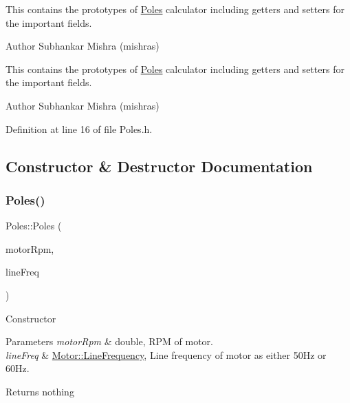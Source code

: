 This contains the prototypes of \hyperlink{class_poles}{Poles} calculator including getters and setters for the important fields.

\begin{DoxyAuthor}{Author}
Subhankar Mishra (mishras) 
\end{DoxyAuthor}


This contains the prototypes of \hyperlink{class_poles}{Poles} calculator including getters and setters for the important fields.

\begin{DoxyAuthor}{Author}
Subhankar Mishra (mishras) 
\end{DoxyAuthor}


Definition at line 16 of file Poles.\+h.



\subsection{Constructor \& Destructor Documentation}
\mbox{\label{class_poles_aade5d01dab7a461e582449e5bb17f6d6}} 
\subsubsection{\texorpdfstring{Poles()}{Poles()}\hspace{0.1cm}{\footnotesize\ttfamily [1/3]}}
{\footnotesize\ttfamily Poles\+::\+Poles (\begin{DoxyParamCaption}\item[{double}]{motor\+Rpm,  }\item[{\hyperlink{class_motor_acee1bdf1b684ad36cb80dc2829d9fcee}{Motor\+::\+Line\+Frequency}}]{line\+Freq }\end{DoxyParamCaption})\hspace{0.3cm}{\ttfamily [inline]}}

Constructor 
\begin{DoxyParams}{Parameters}
{\em motor\+Rpm} & double, R\+PM of motor. \\
\hline
{\em line\+Freq} & \hyperlink{class_motor_acee1bdf1b684ad36cb80dc2829d9fcee}{Motor\+::\+Line\+Frequency}, Line frequency of motor as either 50\+Hz or 60\+Hz. \\
\hline
\end{DoxyParams}
\begin{DoxyReturn}{Returns}
nothing 
\end{DoxyReturn}


